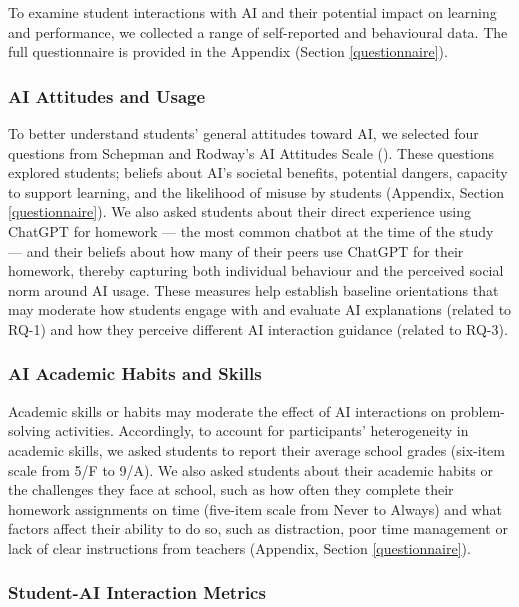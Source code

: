 \documentclass[
  11pt,
]{article}
\begin{document}
To examine student interactions with AI and their potential impact on learning and performance, we collected a range of self-reported and behavioural data. The full questionnaire is provided in the Appendix (Section \ref{questionnaire}).

\subsubsection{AI Attitudes and Usage}\label{ai-attitudes-and-usage}

To better understand students' general attitudes toward AI, we selected four questions from Schepman and Rodway's AI Attitudes Scale (). These questions explored students; beliefs about AI's societal benefits, potential dangers, capacity to support learning, and the likelihood of misuse by students (Appendix, Section \ref{questionnaire}). We also asked students about their direct experience using ChatGPT for homework --- the most common chatbot at the time of the study --- and their beliefs about how many of their peers use ChatGPT for their homework, thereby capturing both individual behaviour and the perceived social norm around AI usage. These measures help establish baseline orientations that may moderate how students engage with and evaluate AI explanations (related to RQ-1) and how they perceive different AI interaction guidance (related to RQ-3).

\subsubsection{AI Academic Habits and Skills}\label{ai-academic-habits-and-skills}

Academic skills or habits may moderate the effect of AI interactions on problem-solving activities. Accordingly, to account for participants' heterogeneity in academic skills, we asked students to report their average school grades (six-item scale from 5/F to 9/A). We also asked students about their academic habits or the challenges they face at school, such as how often they complete their homework assignments on time (five-item scale from Never to Always) and what factors affect their ability to do so, such as distraction, poor time management or lack of clear instructions from teachers (Appendix, Section \ref{questionnaire}).

\subsubsection{Student-AI Interaction Metrics}\label{student-ai-interaction-metrics}
\end{document}
